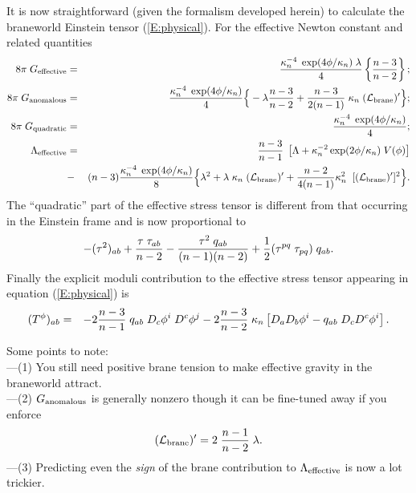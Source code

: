 \documentclass[a4paper,10pt]{article}
\begin{document}
{It is now straightforward (given the formalism developed herein) to
calculate the braneworld Einstein tensor (\ref{E:physical}).  For the
effective Newton constant and related quantities
%
\begin{eqnarray}
8\pi\;G_{\mathrm{effective}} &=&  
{\kappa_n^{-4}\; \exp(4\phi/\kappa_n) \;\lambda\over4} 
\left\{
{n-3\over n-2}
\right\};
\\
8\pi\;G_{\mathrm{anomalous}} &=&   
{\kappa_n^{-4}\; \exp(4\phi/\kappa_n)\over4} 
\Big\{ 
-\lambda {n-3\over n-2} + {n-3\over2(n-1)}\; \kappa_n \;({\mathcal L}_{\mathrm{brane}})'
\Big\}; 
\\
8\pi\;G_{\mathrm{quadratic}} &=& 
{\kappa_n^{-4}\; \exp(4\phi/\kappa_n) \over4}; 
\\
\Lambda_{\mathrm{effective}} &=&
{n-3 \over n-1} \;
\left[ \Lambda  + \kappa_n^{-2} \exp(2\phi/\kappa_n)\; V(\phi) \right]
\\
&-& 
(n-3)
{\kappa_n^{-4}\; \exp(4\phi/\kappa_n)\over8} 
\Big\{  
\lambda^2 
+\lambda\; \kappa_n \;({\mathcal L}_{\mathrm{brane}})'
+ {n-2\over4(n-1)}   \kappa_n^2 \;\;[({\mathcal L}_{\mathrm{brane}})']^2
\Big\}.
\nonumber
\end{eqnarray}
%
The ``quadratic'' part of the effective stress tensor is different from
that occurring in the Einstein frame and is now proportional to
%
\begin{equation}
- (\tau^2)_{ab} 
+ {\tau \; \tau_{ab}\over n-2} 
- {\tau^2 \; q_{ab}\over(n-1)(n-2)} 
+ {1\over2} (\tau^{pq} \; \tau_{pq}) \; q_{ab}.
\end{equation}
%
Finally the explicit moduli contribution to the effective stress
tensor appearing in equation (\ref{E:physical}) is
%
\begin{eqnarray}
(T^\phi) _{ab} &=& 
- 2 {n-3 \over n-1} \; q_{ab} \; D_c \phi^i \; D^c \phi^j 
-2{n-3 \over n-2} \; \kappa_n
\left[  D_a D_b \phi^i - q_{ab} \; D_c D^c \phi^i \right].
\label{E:t-moduli-string} 
\end{eqnarray}


Some points to note:
\\
---(1) You still need positive brane tension to make effective gravity
in the braneworld attract.
\\
---(2) $G_{\mathrm{anomalous}}$ is generally nonzero though it can be fine-tuned
away if you enforce
%
\begin{eqnarray}
({\mathcal L}_{\mathrm{brane}})' = 2 \;{n-1\over n-2} \; \lambda.
\end{eqnarray}
%
---(3) Predicting even the {\emph{sign}} of the brane contribution to
$\Lambda_{\mathrm{effective}}$ is now a lot trickier.

}
\end{document}
